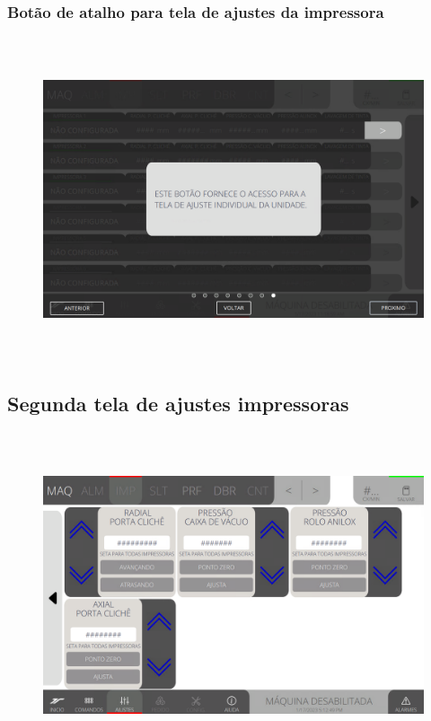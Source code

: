 \newpage
\thispagestyle{fancy}
\vspace*{\fill}
\subsubsection{\small{Botão de atalho para tela de ajustes da impressora}}
\begin{figure}[h]
  \centering
  \includegraphics[width=576px,height=360px]{src/imagesFlexo/04-printter/01-printters/settings/e-8.png}
\end{figure}
\vspace*{\fill}

\newpage
\thispagestyle{fancy}
\vspace*{\fill}
\subsection{Segunda tela de ajustes impressoras}
\begin{figure}[h]
  \centering
  \includegraphics[width=576px,height=360px]{src/imagesFlexo/04-printter/01-printters/settings/e-Tela-Principal-2.png}
\end{figure}

